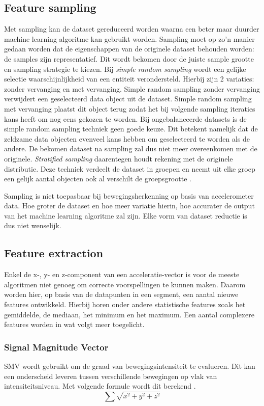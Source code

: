 \subsection{Feature sampling}
Met sampling kan de dataset gereduceerd worden waarna een beter maar duurder machine learning algoritme kan gebruikt worden. Sampling moet op zo'n manier gedaan worden dat de eigenschappen van de originele dataset behouden worden: de samples zijn representatief. Dit wordt bekomen door de juiste sample grootte en sampling strategie te kiezen. Bij \textit{simple random sampling} wordt een gelijke selectie waarschijnlijkheid van een entiteit verondersteld. Hierbij zijn 2 variaties: zonder vervanging en met vervanging. Simple random sampling zonder vervanging verwijdert een geselecteerd data object uit de dataset. Simple random sampling met vervanging plaatst dit object terug zodat het bij volgende sampling iteraties kans heeft om nog eens gekozen te worden. Bij ongebalanceerde datasets is de simple random sampling techniek geen goede keuze. Dit betekent namelijk dat de zeldzame data objecten evenveel kans hebben om geselecteerd te worden als de andere. De bekomen dataset na sampling zal dus niet meer overeenkomen met de originele. \textit{Stratified sampling} daarentegen houdt rekening met de originele distributie. Deze techniek verdeelt de dataset in groepen en neemt uit elke groep een gelijk aantal objecten ook al verschilt de groepsgrootte \cite{ref69}.

Sampling is niet toepasbaar bij bewegingsherkenning op basis van accelerometer data. Hoe groter de dataset en hoe meer variatie hierin, hoe accurater de output van het machine learning algoritme zal zijn. Elke vorm van dataset reductie is dus niet wenselijk.

\subsection{Feature extraction}
Enkel de x-, y- en z-component van een acceleratie-vector is voor de meeste algoritmen niet genoeg om correcte voorspellingen te kunnen maken. Daarom worden hier, op basis van de datapunten in een segment, een aantal nieuwe features ontwikkeld. Hierbij horen onder andere statistische features zoals het gemiddelde, de mediaan, het minimum en het maximum. Een aantal complexere features worden in wat volgt meer toegelicht.

\subsubsection{Signal Magnitude Vector}
SMV wordt gebruikt om de graad van bewegingsintensiteit te evalueren. Dit kan een onderscheid leveren tussen verschillende bewegingen op vlak van intensiteitsniveau. Met volgende formule wordt dit berekend \cite{ref17}.
\[
\sum{\sqrt{x^2 + y^2 + z^2}}
\]

